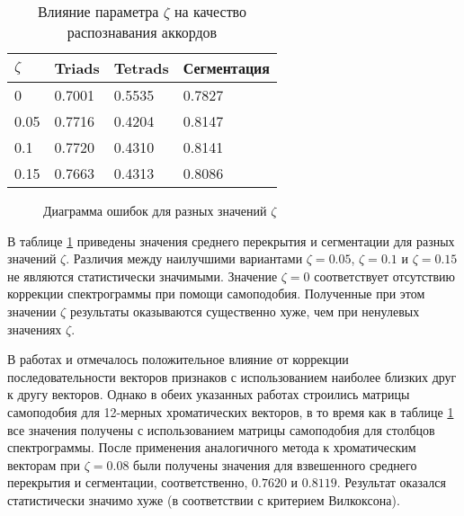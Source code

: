 \begin{table} [htbp]
  \centering
  \parbox{15cm}{\caption{Влияние параметра $\zeta$ на качество распознавания
  аккордов} \label{Tzeta}}
  \begin{tabular}{|l|l|l|l|}
  \hline
  $\zeta$ & Triads & Tetrads & Сегментация \\
  \hline
  0 & 0.7001 & 0.5535 & 0.7827 \\
  0.05 & 0.7716 & 0.4204 & 0.8147 \\
  0.1 & 0.7720 & 0.4310 & 0.8141 \\
  0.15 & 0.7663 & 0.4313 & 0.8086 \\
  \hline
  \end{tabular}
\end{table}

\begin{figure}[htbp]
  \begin{minipage}[h]{0.49\linewidth}
  \end{minipage}
  \hfill
  \begin{minipage}[h]{0.49\linewidth}
  \end{minipage}
  \caption{Диаграмма ошибок для разных значений $\zeta$}
  \label{img:zeta}
\end{figure}

В таблице \ref{Tzeta} приведены значения среднего перекрытия и сегментации для
разных значений $\zeta$. Различия между наилучшими вариантами $\zeta=0.05$,
$\zeta=0.1$ и $\zeta=0.15$ не являются статистически значимыми. Значение
$\zeta=0$ соответствует отсутствию коррекции спектрограммы при помощи
самоподобия. Полученные при этом значении $\zeta$ результаты оказываются
существенно хуже, чем при ненулевых значениях $\zeta$.

В работах \cite{Mauch2010} и \cite{Cho2011} отмечалось положительное влияние от
коррекции последовательности векторов признаков с использованием наиболее
близких друг к другу векторов. Однако в обеих указанных работах строились
матрицы самоподобия для 12-мерных хроматических векторов, в то время как в
таблице \ref{Tzeta} все значения получены с использованием матрицы самоподобия
для столбцов спектрограммы. После применения аналогичного метода к хроматическим
векторам при $\zeta=0.08$ были получены значения для взвешенного среднего
перекрытия и сегментации, соответственно, $0.7620$ и $0.8119$. Результат
оказался статистически значимо хуже (в соответствии с критерием Вилкоксона).

